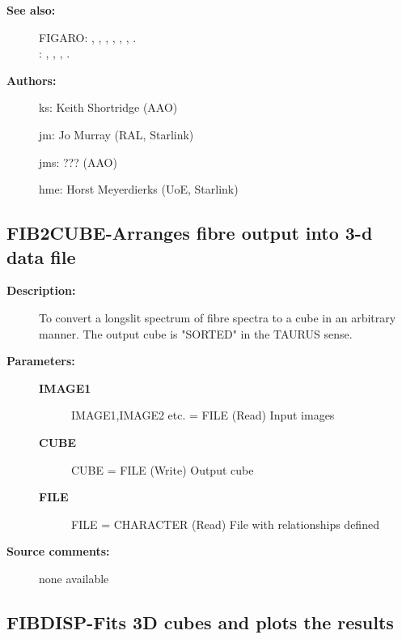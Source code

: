 \begin{description}
\begin{description}
\item [\textbf{See also:}]
FIGARO: , , , , , , .\\
: , , , .\\

\item [\textbf{Authors:}]
 ks: Keith Shortridge (AAO)

 jm: Jo Murray (RAL, Starlink)

 jms: ??? (AAO)

 hme: Horst Meyerdierks (UoE, Starlink)

\end{description}
\subsection{FIB2CUBE-\label{FIB2CUBE}Arranges fibre output into 3-d data file}
\begin{description}

\item [\textbf{Description:}]
  To convert a longslit spectrum of fibre spectra to a cube in an
 arbitrary manner. The output cube is "SORTED" in the TAURUS sense.

\item [\textbf{Parameters:}]
\begin{description}
\item [\textbf{IMAGE1}]
   IMAGE1,IMAGE2 etc. = FILE (Read)
        Input images
\item [\textbf{CUBE}]
   CUBE = FILE (Write)
        Output cube
\item [\textbf{FILE}]
   FILE = CHARACTER (Read)
        File with relationships defined
\end{description}

\item [\textbf{Source comments:}]
\begin{terminalv}
  none available

\end{terminalv}
\end{description}
\subsection{FIBDISP-\label{FIBDISP}Fits 3D cubes and plots the results}
\begin{description}


\end{description}
\end{description}
